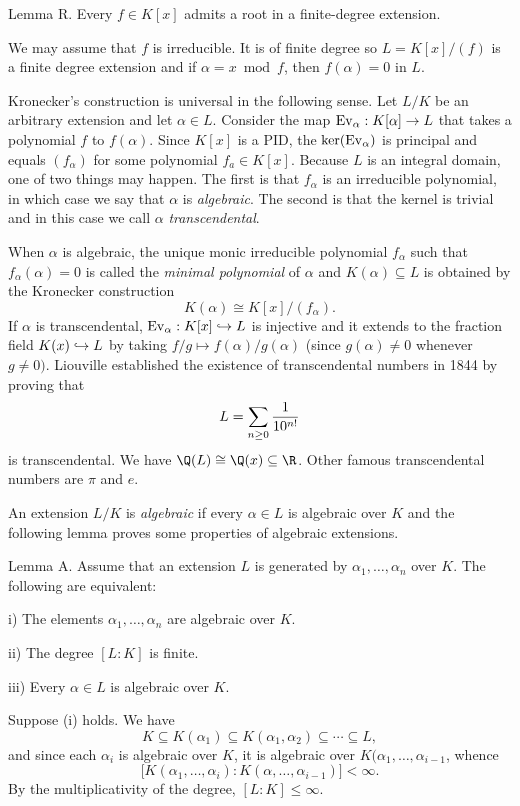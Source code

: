 \proclaim Lemma R. Every $f\in K[x]$ admits a root in a finite-degree extension.

\proof We may assume that $f$ is irreducible. It is of finite degree so $L = K[x]/(f)$ is a finite degree extension and if $\alpha = x \bmod f$, then $f(\alpha) = 0$ in $L$.\slug

Kronecker's construction is universal in the following sense. Let $L/K$ be an arbitrary extension and let $\alpha\in L$. Consider the map $\mathop {\rm Ev}_\alpha : K[\alpha] \to L$ that takes a polynomial $f$ to $f(\alpha)$. Since $K[x]$ is a PID, the $\ker(\mathop {\rm Ev}_\alpha)$ is principal and equals $(f_\alpha)$ for some polynomial $f_a\in K[x]$. Because $L$ is an integral domain, one of two things may happen. The first is that $f_\alpha$ is an irreducible polynomial, in which case we say that $\alpha$ is {\it algebraic}. The second is that the kernel is trivial and in this case we call $\alpha$ {\it transcendental}.

When $\alpha$ is algebraic, the unique monic irreducible polynomial $f_\alpha$ such that $f_\alpha(\alpha) = 0$ is called the {\it minimal polynomial} of $\alpha$ and $K(\alpha) \subseteq L$ is obtained by the Kronecker construction
$$K(\alpha)\cong K[x]/(f_\alpha).$$
If $\alpha$ is transcendental, $\mathop {\rm Ev}_\alpha : K[x] \hookrightarrow L$ is injective and it extends to the fraction field $K(x) \hookrightarrow L$ by taking $f/g \mapsto f(\alpha)/g(\alpha)$ (since $g(\alpha) \neq 0$ whenever $g\neq 0)$. Liouville established the existence of transcendental numbers in 1844 by proving that
$$L = \sum_{n\geq 0} {1\over 10^{n!}}$$
is transcendental. We have $\Q(L)\cong \Q(x) \subseteq \R$. Other famous transcendental numbers are $\pi$ and $e$.

An extension $L/K$ is {\it algebraic} if every $\alpha\in L$ is algebraic over $K$ and the following lemma proves some properties of algebraic extensions.

\proclaim Lemma A. Assume that an extension $L$ is generated by $\alpha_1,\ldots,\alpha_n$ over $K$. The following are equivalent:
\medskip
\item{i)} The elements $\alpha_1,\ldots,\alpha_n$ are algebraic over $K$.
\smallskip
\item{ii)} The degree $[L:K]$ is finite.
\smallskip
\item{iii)} Every $\alpha\in L$ is algebraic over $K$.
\medskip

\proof Suppose (i) holds. We have
$$K \subseteq K(\alpha_1)\subseteq K(\alpha_1, \alpha_2) \subseteq \cdots \subseteq L,$$
and since each $\alpha_i$ is algebraic over $K$, it is algebraic over $K(\alpha_1,\ldots,\alpha_{i-1}$, whence
$$\big[ K(\alpha_1,\ldots,\alpha_i) : K(\alpha,\ldots,\alpha_{i-1})\big] < \infty.$$
By the multiplicativity of the degree, $[L:K] \leq \infty$.

